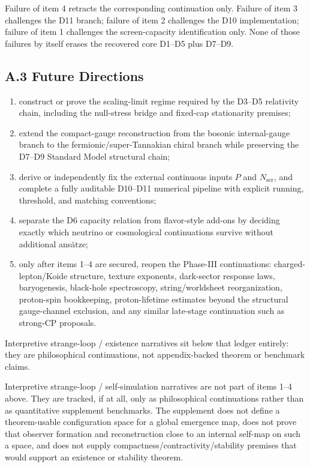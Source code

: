 Failure of item 4 retracts the corresponding continuation only. Failure of item 3 challenges the D11 branch; failure of item 2 challenges the D10 implementation; failure of item 1 challenges the screen-capacity identification only. None of those failures by itself erases the recovered core D1--D5 plus D7--D9.

\subsection{A.3 Future Directions}\label{a3-future-directions}

\begin{enumerate}
\item construct or prove the scaling-limit regime required by the D3--D5 relativity chain, including the null-stress bridge and fixed-cap stationarity premises;
\item extend the compact-gauge reconstruction from the bosonic internal-gauge branch to the fermionic/super-Tannakian chiral branch while preserving the D7--D9 Standard Model structural chain;
\item derive or independently fix the external continuous inputs $P$ and $N_{\mathrm{scr}}$, and complete a fully auditable D10--D11 numerical pipeline with explicit running, threshold, and matching conventions;
\item separate the D6 capacity relation from flavor-style add-ons by deciding exactly which neutrino or cosmological continuations survive without additional ans\"atze;
\item only after items 1--4 are secured, reopen the Phase-III continuations: charged-lepton/Koide structure, texture exponents, dark-sector response laws, baryogenesis, black-hole spectroscopy, string/worldsheet reorganization, proton-spin bookkeeping, proton-lifetime estimates beyond the structural gauge-channel exclusion, and any similar late-stage continuation such as strong-CP proposals.
\end{enumerate}

Interpretive strange-loop / existence narratives sit below that ledger entirely: they are philosophical continuations, not appendix-backed theorem or benchmark claims.

Interpretive strange-loop / self-simulation narratives are not part of items 1--4 above. They are tracked, if at all, only as philosophical continuations rather than as quantitative supplement benchmarks. The supplement does not define a theorem-usable configuration space for a global emergence map, does not prove that observer formation and reconstruction close to an internal self-map on such a space, and does not supply compactness/contractivity/stability premises that would support an existence or stability theorem.


